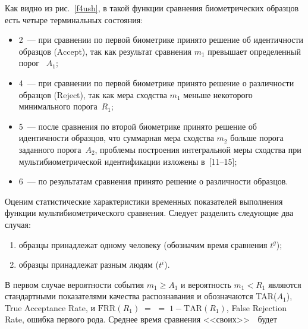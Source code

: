 \begin{multicols}{2}
     Как видно из рис.~\ref{f4ush}, в такой функции сравнения биометрических 
образцов есть четыре терминальных состояния:
     \begin{itemize}
\item 2~--- при сравнении по первой биометрике принято решение об идентичности 
образцов (Accept), так как результат сравнения $m_1$ превышает определенный 
порог ~$A_1$;
\item 4~--- при сравнении по первой биометрике принято решение о различности 
образцов (Reject), так как мера сходства $m_1$ меньше некоторого минимального 
порога~$R_1$;
\item 5~--- после сравнения по второй биометрике принято решение об идентичности 
образцов, что суммарная мера сходства $m_2$  больше порога  заданного 
порога~$A_2$, проблемы построения
интегральной меры сходства при 
мульти\-био\-мет\-ри\-че\-ской идентификации изложены в~[11--15];
\item 6~--- по результатам сравнения принято решение о различности образцов.
\end{itemize}

     Оценим статистические характеристики временных показателей выполнения 
функции мультибиометрического сравнения. Следует разделить следующие два случая:
     \begin{enumerate}[(1)]
\item образцы принадлежат одному человеку (обозначим время сравнения $t^g$);
\item образцы принадлежат разным людям ($t^i$). 
\end{enumerate}

     В первом случае вероятности события $m_1\geq A_1$ и вероятность $m_1<R_1$ 
являются стандартными показателями качества распознавания и обозначаются 
TAR($A_1$), True Acceptance Rate, и $\mathrm{FRR}(R_1)\;=$ %
 $=\;1- \mathrm{TAR}(R_1)$, 
False Rejection 
Rate, ошибка первого рода. Среднее время сравнения <<своих>>\ \ будет %

\end{multicols}

\begin{figure} %
     \vspace*{1pt}
\begin{center}
\mbox{%
\epsfxsize=133.51mm
}
\end{center}
\vspace*{-9pt}
\vspace*{12pt}
\begin{center}
\mbox{%
\epsfxsize=138.849mm
}
\end{center}
\vspace*{-9pt}
\end{figure}

